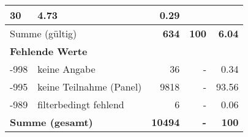 \begin{longtable}{lXrrr}
       \num{30} &
       \num[round-mode=places,round-precision=2]{4.73} &
         \num[round-mode=places,round-precision=2]{0.29} \\
     \midrule
     \multicolumn{2}{l}{Summe (gültig)} &
       \textbf{\num{634}} &
     \textbf{\num{100}} &
       \textbf{\num[round-mode=places,round-precision=2]{6.04}} \\
     \multicolumn{5}{l}{\textbf{Fehlende Werte}}\\
       -998 &
       keine Angabe &
         \num{36} &
        - &
         \num[round-mode=places,round-precision=2]{0.34} \\
       -995 &
       keine Teilnahme (Panel) &
         \num{9818} &
        - &
         \num[round-mode=places,round-precision=2]{93.56} \\
       -989 &
       filterbedingt fehlend &
         \num{6} &
        - &
         \num[round-mode=places,round-precision=2]{0.06} \\
     \midrule
     \multicolumn{2}{l}{\textbf{Summe (gesamt)}} &
          \textbf{\num{10494}} &
        \textbf{-} &
        \textbf{\num{100}} \\
     \bottomrule
     \end{longtable}
     
